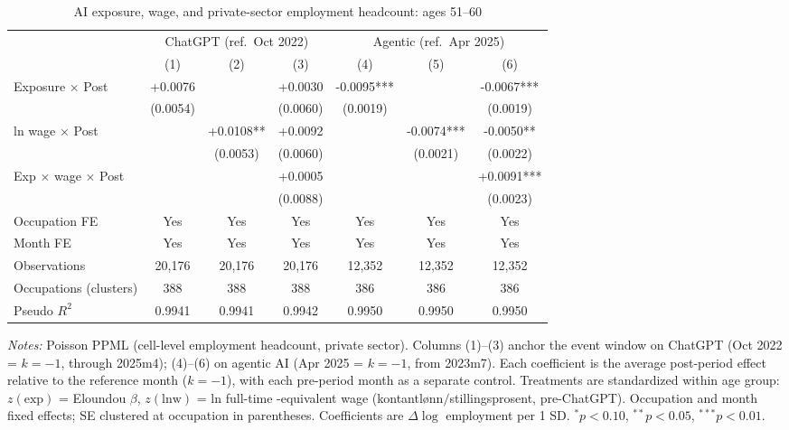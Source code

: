 \begin{table}[htbp]\centering
\caption{AI exposure, wage, and private-sector employment headcount: ages 51–60}
\label{tab:ca_did_age4}
\small
\begin{tabular}{lcccccc}
\toprule
 & \multicolumn{3}{c}{ChatGPT (ref.\ Oct 2022)} & \multicolumn{3}{c}{Agentic (ref.\ Apr 2025)} \\
\cmidrule(lr){2-4} \cmidrule(lr){5-7}
 & (1) & (2) & (3) & (4) & (5) & (6) \\
\midrule
Exposure $\times$ Post & +0.0076 &  & +0.0030 & -0.0095*** &  & -0.0067*** \\
 & (0.0054) &  & (0.0060) & (0.0019) &  & (0.0019) \\
ln wage $\times$ Post &  & +0.0108** & +0.0092 &  & -0.0074*** & -0.0050** \\
 &  & (0.0053) & (0.0060) &  & (0.0021) & (0.0022) \\
Exp $\times$ wage $\times$ Post &  &  & +0.0005 &  &  & +0.0091*** \\
 &  &  & (0.0088) &  &  & (0.0023) \\
\midrule
Occupation FE & Yes & Yes & Yes & Yes & Yes & Yes \\
Month FE & Yes & Yes & Yes & Yes & Yes & Yes \\
Observations & 20,176 & 20,176 & 20,176 & 12,352 & 12,352 & 12,352 \\
Occupations (clusters) & 388 & 388 & 388 & 386 & 386 & 386 \\
Pseudo $R^2$ & 0.9941 & 0.9941 & 0.9942 & 0.9950 & 0.9950 & 0.9950 \\
\bottomrule
\end{tabular}
\begin{minipage}{\linewidth}\vspace{2pt}\footnotesize
\emph{Notes:} Poisson PPML (cell-level employment headcount, private sector). Columns (1)--(3) anchor the event window on ChatGPT (Oct 2022 = $k{=}{-}1$, through 2025m4); (4)--(6) on agentic AI (Apr 2025 = $k{=}{-}1$, from 2023m7). Each coefficient is the average post-period effect relative to the reference month ($k{=}{-}1$), with each pre-period month as a separate control. Treatments are standardized within age group: $z(\text{exp})$ = Eloundou $\beta$, $z(\text{lnw})$ = ln full-time -equivalent wage (kontantl\o nn$/$stillingsprosent, pre-ChatGPT). Occupation and month fixed effects; SE clustered at occupation in parentheses. Coefficients are $\Delta\log$ employment per 1 SD. $^{*}p<0.10$, $^{**}p<0.05$, $^{***}p<0.01$.
\end{minipage}
\end{table}